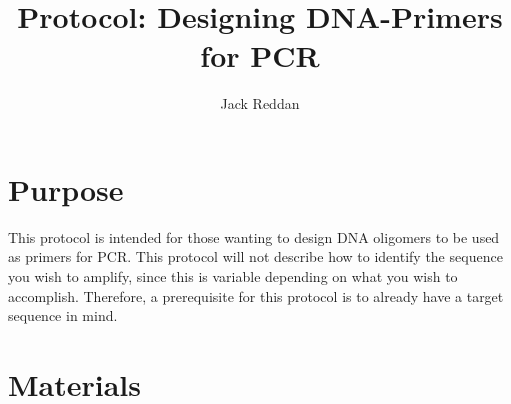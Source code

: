 \documentclass{article}
\begin{document}
\title{Protocol: Designing DNA-Primers for PCR}
\author{Jack Reddan}

\maketitle{}

\tableofcontents{}

\section{Purpose}
This protocol is intended for those wanting to design DNA oligomers to be used as primers for PCR.
This protocol will not describe how to identify the sequence you wish to amplify,
since this is variable depending on what you wish to accomplish.
Therefore, a prerequisite for this protocol is to already have a target sequence in mind.

\section{Materials}


%
%
\end{document}
